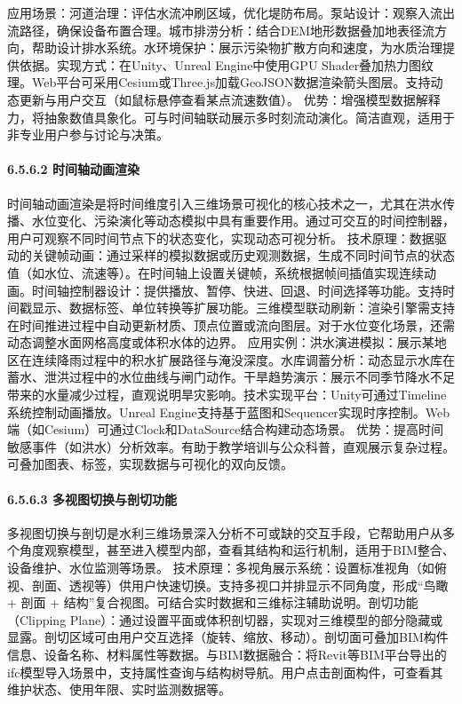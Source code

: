 应用场景：河道治理：评估水流冲刷区域，优化堤防布局。泵站设计：观察入流出流路径，确保设备布置合理。城市排涝分析：结合DEM地形数据叠加地表径流方向，帮助设计排水系统。水环境保护：展示污染物扩散方向和速度，为水质治理提供依据。实现方式：在Unity、Unreal Engine中使用GPU Shader叠加热力图纹理。Web平台可采用Cesium或Three.js加载GeoJSON数据渲染箭头图层。支持动态更新与用户交互（如鼠标悬停查看某点流速数值）。 优势：增强模型数据解释力，将抽象数值具象化。可与时间轴联动展示多时刻流动演化。简洁直观，适用于非专业用户参与讨论与决策。 \paragraph{6.5.6.2 时间轴动画渲染}\label{ux65f6ux95f4ux8f74ux52a8ux753bux6e32ux67d3} 时间轴动画渲染是将时间维度引入三维场景可视化的核心技术之一，尤其在洪水传播、水位变化、污染演化等动态模拟中具有重要作用。通过可交互的时间控制器，用户可观察不同时间节点下的状态变化，实现动态可视分析。 技术原理：数据驱动的关键帧动画：通过采样的模拟数据或历史观测数据，生成不同时间节点的状态值（如水位、流速等）。在时间轴上设置关键帧，系统根据帧间插值实现连续动画。时间轴控制器设计：提供播放、暂停、快进、回退、时间选择等功能。支持时间戳显示、数据标签、单位转换等扩展功能。三维模型联动刷新：渲染引擎需支持在时间推进过程中自动更新材质、顶点位置或流向图层。对于水位变化场景，还需动态调整水面网格高度或体积水体的边界。 应用实例：洪水演进模拟：展示某地区在连续降雨过程中的积水扩展路径与淹没深度。水库调蓄分析：动态显示水库在蓄水、泄洪过程中的水位曲线与闸门动作。干旱趋势演示：展示不同季节降水不足带来的水量减少过程，直观说明旱灾影响。技术实现平台：Unity可通过Timeline系统控制动画播放。Unreal Engine支持基于蓝图和Sequencer实现时序控制。Web端（如Cesium）可通过Clock和DataSource结合构建动态场景。 优势：提高时间敏感事件（如洪水）分析效率。有助于教学培训与公众科普，直观展示复杂过程。可叠加图表、标签，实现数据与可视化的双向反馈。 \paragraph{6.5.6.3 多视图切换与剖切功能}\label{ux591aux89c6ux56feux5207ux6362ux4e0eux5256ux5207ux529fux80fd} 多视图切换与剖切是水利三维场景深入分析不可或缺的交互手段，它帮助用户从多个角度观察模型，甚至进入模型内部，查看其结构和运行机制，适用于BIM整合、设备维护、水位监测等场景。 技术原理：多视角展示系统：设置标准视角（如俯视、剖面、透视等）供用户快速切换。支持多视口并排显示不同角度，形成``鸟瞰 + 剖面 + 结构''复合视图。可结合实时数据和三维标注辅助说明。剖切功能（Clipping Plane）：通过设置平面或体积剖切器，实现对三维模型的部分隐藏或显露。剖切区域可由用户交互选择（旋转、缩放、移动）。剖切面可叠加BIM构件信息、设备名称、材料属性等数据。与BIM数据融合：将Revit等BIM平台导出的ifc模型导入场景中，支持属性查询与结构树导航。用户点击剖面构件，可查看其维护状态、使用年限、实时监测数据等。 